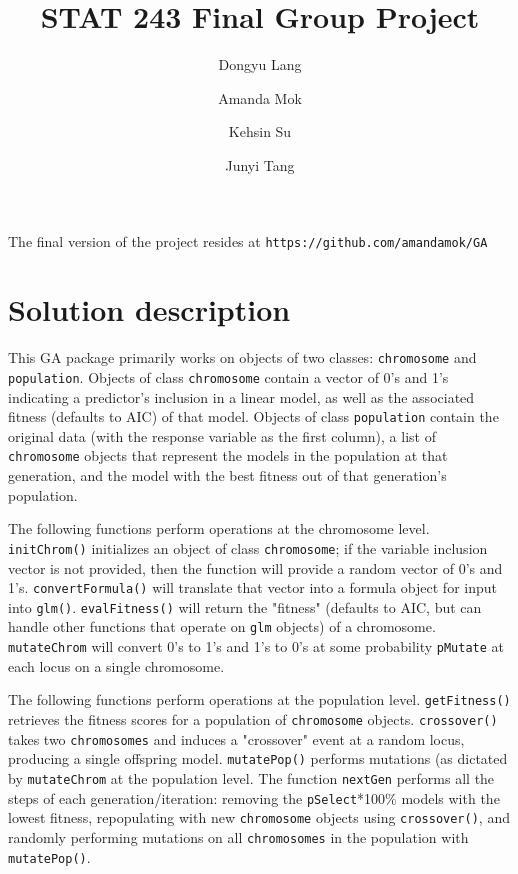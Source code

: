 \documentclass{article}\usepackage[]{graphicx}\usepackage[]{color}
\title{STAT 243 Final Group Project}
\author{
  Dongyu Lang
  \and
  Amanda Mok
  \and
  Kehsin Su
  \and
  Junyi Tang
}
\begin{document}
\maketitle

The final version of the project resides at \texttt{https://github.com/amandamok/GA}

\section{Solution description}

This GA package primarily works on objects of two classes: \texttt{chromosome} and \texttt{population}. Objects of class \texttt{chromosome} contain a vector of 0's and 1's indicating a predictor's inclusion in a linear model, as well as the associated fitness (defaults to AIC) of that model. Objects of class \texttt{population} contain the original data (with the response variable as the first column), a list of \texttt{chromosome} objects that represent the models in the population at that generation, and the model with the best fitness out of that generation's population.

The following functions perform operations at the chromosome level. \texttt{initChrom()} initializes an object of class \texttt{chromosome}; if the variable inclusion vector is not provided, then the function will provide a random vector of 0's and 1's. \texttt{convertFormula()} will translate that vector into a formula object for input into \texttt{glm()}. \texttt{evalFitness()} will return the "fitness" (defaults to AIC, but can handle other functions that operate on \texttt{glm} objects) of a chromosome. \texttt{mutateChrom} will convert 0's to 1's and 1's to 0's at some probability \texttt{pMutate} at each locus on a single chromosome.

The following functions perform operations at the population level. \texttt{getFitness()} retrieves the fitness scores for a population of \texttt{chromosome} objects. \texttt{crossover()} takes two \texttt{chromosomes} and induces a "crossover" event at a random locus, producing a single offspring model. \texttt{mutatePop()} performs mutations (as dictated by \texttt{mutateChrom} at the population level. The function \texttt{nextGen} performs all the steps of each generation/iteration: removing the \texttt{pSelect}*100\% models with the lowest fitness, repopulating with new \texttt{chromosome} objects using \texttt{crossover()}, and randomly performing mutations on all \texttt{chromosomes} in the population with \texttt{mutatePop()}.
\end{document}
